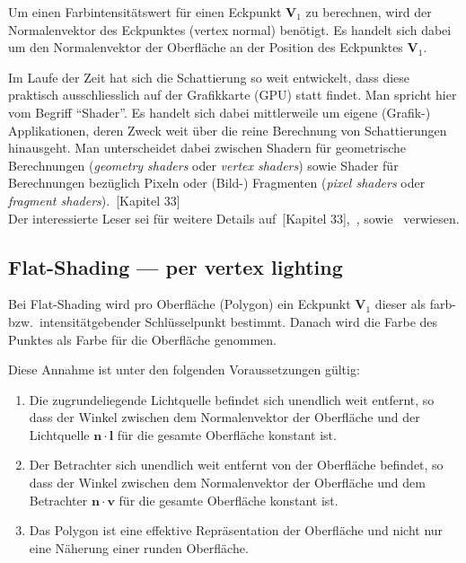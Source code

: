 Um einen Farbintensitätswert für einen Eckpunkt $\bm{V}_{1}$ zu berechnen, wird der
Normalenvektor des Eckpunktes (vertex normal) benötigt. Es handelt sich dabei
um den Normalenvektor der Oberfläche an der Position des Eckpunktes $\bm{V}_{1}$.

Im Laufe der Zeit hat sich die Schattierung so weit entwickelt, dass
diese praktisch ausschliesslich auf der Grafikkarte (GPU) statt findet.
Man spricht hier vom Begriff ``Shader''. Es handelt sich dabei
mittlerweile um eigene (Grafik-) Applikationen, deren Zweck weit über
die reine Berechnung von Schattierungen hinausgeht.  Man unterscheidet
dabei zwischen Shadern für geometrische Berechnungen (\textit{geometry
    shaders} oder \textit{vertex shaders}) sowie Shader für Berechnungen
bezüglich Pixeln  oder (Bild-) Fragmenten (\textit{pixel shaders} oder
\textit{fragment shaders}).~\cite{hughes_computer_2013}[Kapitel 33]\\
Der interessierte Leser sei für weitere Details
auf~\cite{hughes_computer_2013}[Kapitel
33],~\cite{opengl_foundation_rendering_2015},
sowie~\cite{fernando_cg_2003} verwiesen.

\subsection{Flat-Shading --- per vertex lighting}
\label{subsec:flat_shading}


Bei Flat-Shading wird pro Oberfläche (Polygon) ein Eckpunkt $\bm{V}_{1}$ dieser als
farb- bzw.\ intensitätgebender Schlüsselpunkt bestimmt. Danach wird die Farbe
des Punktes als Farbe für die Oberfläche genommen.

Diese Annahme ist unter den folgenden Voraussetzungen gültig:
\begin{enumerate}
    \item{Die zugrundeliegende Lichtquelle befindet sich unendlich weit
            entfernt, so dass der Winkel zwischen dem
            Normalenvektor der Oberfläche und der Lichtquelle
            $\bm{n}\cdot{}\bm{l}$ für die gesamte Oberfläche konstant ist.}
    \item{Der Betrachter sich unendlich weit entfernt von der Oberfläche
            befindet, so dass der Winkel zwischen dem Normalenvektor der
            Oberfläche und dem Betrachter $\bm{n}\cdot{}\bm{v}$ für die
            gesamte Oberfläche konstant ist.}
    \item{Das Polygon ist eine effektive Repräsentation der Oberfläche
            und nicht nur eine Näherung einer runden Oberfläche.}
\end{enumerate}

